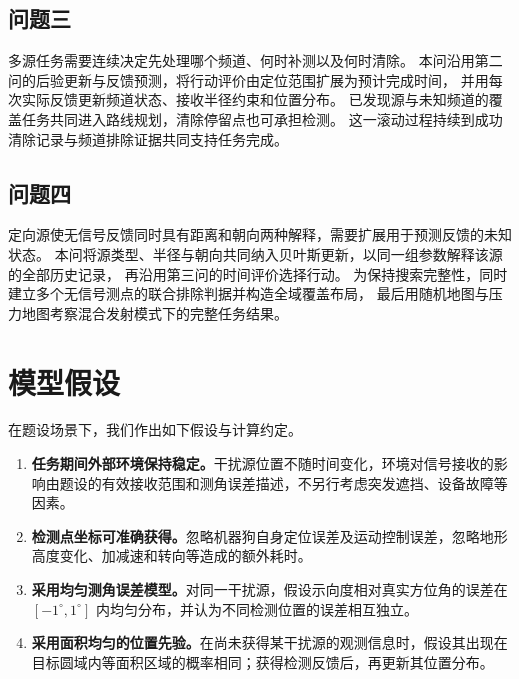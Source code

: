 \documentclass[UTF8,a4paper,12pt]{ctexart}
\begin{document}
\subsection{问题三}

多源任务需要连续决定先处理哪个频道、何时补测以及何时清除。
本问沿用第二问的后验更新与反馈预测，将行动评价由定位范围扩展为预计完成时间，
并用每次实际反馈更新频道状态、接收半径约束和位置分布。
已发现源与未知频道的覆盖任务共同进入路线规划，清除停留点也可承担检测。
这一滚动过程持续到成功清除记录与频道排除证据共同支持任务完成。

\subsection{问题四}

定向源使无信号反馈同时具有距离和朝向两种解释，需要扩展用于预测反馈的未知状态。
本问将源类型、半径与朝向共同纳入贝叶斯更新，以同一组参数解释该源的全部历史记录，
再沿用第三问的时间评价选择行动。
为保持搜索完整性，同时建立多个无信号测点的联合排除判据并构造全域覆盖布局，
最后用随机地图与压力地图考察混合发射模式下的完整任务结果。


\section{模型假设}
\label{sec:assumptions}

在题设场景下，我们作出如下假设与计算约定。
\begin{enumerate}
  \item \textbf{任务期间外部环境保持稳定。}干扰源位置不随时间变化，环境对信号接收的影响由题设的有效接收范围和测角误差描述，不另行考虑突发遮挡、设备故障等因素。
  \item \textbf{检测点坐标可准确获得。}忽略机器狗自身定位误差及运动控制误差，忽略地形高度变化、加减速和转向等造成的额外耗时。
  \item \textbf{采用均匀测角误差模型。}对同一干扰源，假设示向度相对真实方位角的误差在 $[-1^\circ,1^\circ]$ 内均匀分布，并认为不同检测位置的误差相互独立。
  \item \textbf{采用面积均匀的位置先验。}在尚未获得某干扰源的观测信息时，假设其出现在目标圆域内等面积区域的概率相同；获得检测反馈后，再更新其位置分布。
\end{enumerate}
\end{document}
